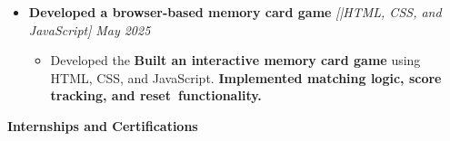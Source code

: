 \documentclass[a4paper,10pt]{article}
\newcommand{\resheading}[1]{{\small \colorbox{mygrey}{\begin{minipage}{0.975\textwidth}{\textbf{#1 \vphantom{p\^{E}}}}\end{minipage}}}}
\begin{document}
\iffalse
\begin{itemize}


\item {\bf Review on Perceptron-based Prefetch Filtering
} \textit{[Prof. Sameer Kulkarni]}
\textit{\hfill 
{Feb-Apr 2021}
}



\begin{itemize}

\vspace{-1.5mm}


\item Coordinated in a team three to \textbf{review a paper based on perceptron-based prefetch filtering (PPF) }presented in the \textbf{46th Annual International Symposium on Computer Architecture (ISCA ’19)}


\vspace{-1mm}

\item \textbf{Presented a comprehensive review} of PPF using an underlying \textbf{Signature Path Prefetcher}

\vspace{-1mm}
\end{itemize}
\end{itemize}

\fi

\begin{itemize}


\item {\bf Developed a browser-based memory card game
} \textit{[|HTML, CSS, and JavaScript]}
\textit{\hfill 
{May 2025}
}



\begin{itemize}

\vspace{-1.5mm}

\item Developed the \textbf{Built an interactive memory card game 
} using HTML, CSS, and JavaScript. \textbf{Implemented matching logic, score tracking, and reset functionality.} 

\vspace{-1mm}

\end{itemize}
\end{itemize}









\resheading{\textbf{Internships and Certifications} }
\end{document}
